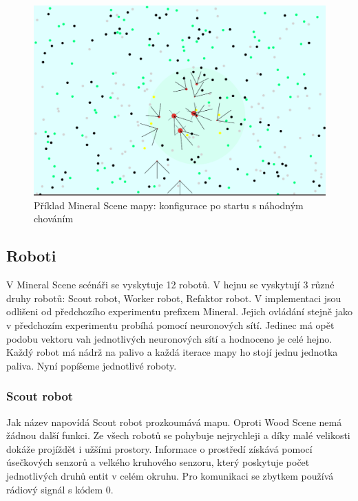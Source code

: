 \begin{figure}[h]\centering
	\includegraphics[width=\columnwidth]{../img/MineralMap/MineralRandom.png}
	\caption{Příklad Mineral Scene mapy: konfigurace po startu s  náhodným chováním}
	\label{obr04:MineralSceneRandomStart}
\end{figure}
\clearpage 
\subsection{Roboti}
V Mineral Scene scénáři se vyskytuje 12 robotů. V hejnu se vyskytují 3 různé druhy robotů: Scout robot, Worker robot, Refaktor robot. V implementaci jsou odlišeni od předchozího experimentu prefixem Mineral. Jejich ovládání stejně jako v předchozím experimentu probíhá pomocí neuronových sítí. Jedinec má opět podobu vektoru vah jednotlivých neuronových sítí a hodnoceno je celé hejno. Každý robot má nádrž na palivo a každá iterace mapy ho stojí jednu jednotka paliva. Nyní popíšeme jednotlivé roboty.
\subsubsection{Scout robot}
Jak název napovídá Scout robot prozkoumává mapu. Oproti Wood Scene nemá žádnou další funkci. Ze všech robotů se pohybuje nejrychleji a díky malé velikosti dokáže projíždět i užšími prostory. Informace o prostředí získává pomocí úsečkových senzorů a velkého kruhového senzoru, který poskytuje počet jednotlivých druhů entit v celém okruhu. Pro komunikaci se zbytkem používá rádiový signál s kódem 0. 
\par  

